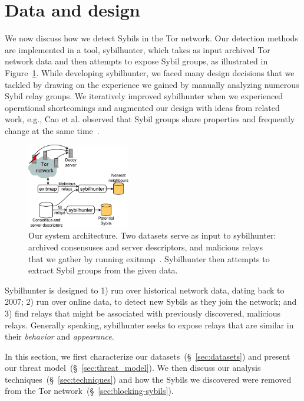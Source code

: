 \section{Data and design}
\label{sec:design}
We now discuss how we detect Sybils in the Tor network.  Our detection methods
are implemented in a tool, sybilhunter, which takes as input archived Tor
network data and then attempts to expose Sybil groups, as illustrated in
Figure~\ref{fig:system}.  While developing sybilhunter, we faced many design
decisions that we tackled by drawing on the experience we gained by manually
analyzing numerous Sybil relay groups.  We iteratively improved sybilhunter when
we experienced operational shortcomings and augmented our design with ideas from
related work, e.g., Cao et al. observed that Sybil groups share properties and
frequently change at the same time~\cite{Cao2014a}.

\begin{figure}[t]
	\centering
	\includegraphics[width=0.4\textwidth]{diagrams/system_architecture.pdf}
	\caption{Our system architecture.  Two datasets serve as input to
		sybilhunter: archived consensuses and server descriptors, and malicious
		relays that we gather by running exitmap~\cite{Winter2014a}.
		Sybilhunter then attempts to extract Sybil groups from the given data.}
	\label{fig:system}
\end{figure}

Sybilhunter is designed to 1) run over historical network data, dating back to
2007; 2) run over online data, to detect new Sybils as they join the network;
and 3) find relays that might be associated with previously discovered,
malicious relays.  Generally speaking, sybilhunter seeks to expose relays that
are similar in their \emph{behavior} and \emph{appearance}.

In this section, we first characterize our datasets~(\S~\ref{sec:datasets}) and
present our threat model~(\S~\ref{sec:threat_model}).  We then discuss our
analysis techniques~(\S~\ref{sec:techniques}) and how the Sybils we
discovered were removed from the Tor network~(\S~\ref{sec:blocking-sybils}).

